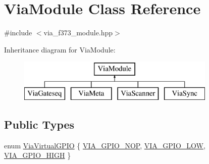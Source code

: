 \hypertarget{class_via_module}{}\section{Via\+Module Class Reference}
\label{class_via_module}


{\ttfamily \#include $<$via\+\_\+f373\+\_\+module.\+hpp$>$}

Inheritance diagram for Via\+Module\+:\begin{figure}[H]
\begin{center}
\leavevmode
\includegraphics[height=2.000000cm]{class_via_module}
\end{center}
\end{figure}
\subsection*{Public Types}
\begin{DoxyCompactItemize}
\item 
enum \mbox{\hyperlink{class_via_module_a1b83ad8b5871ad71e582502e9c252eb6}{Via\+Virtual\+G\+P\+IO}} \{ \mbox{\hyperlink{class_via_module_a1b83ad8b5871ad71e582502e9c252eb6a96faf1f58d32b3303a08663f3664d518}{V\+I\+A\+\_\+\+G\+P\+I\+O\+\_\+\+N\+OP}}, 
\mbox{\hyperlink{class_via_module_a1b83ad8b5871ad71e582502e9c252eb6a15269d472b985002290edb9dc57c649d}{V\+I\+A\+\_\+\+G\+P\+I\+O\+\_\+\+L\+OW}}, 
\mbox{\hyperlink{class_via_module_a1b83ad8b5871ad71e582502e9c252eb6a2b8e66a8662ac906c211452d324818d5}{V\+I\+A\+\_\+\+G\+P\+I\+O\+\_\+\+H\+I\+GH}}
 \}
\end{DoxyCompactItemize}
